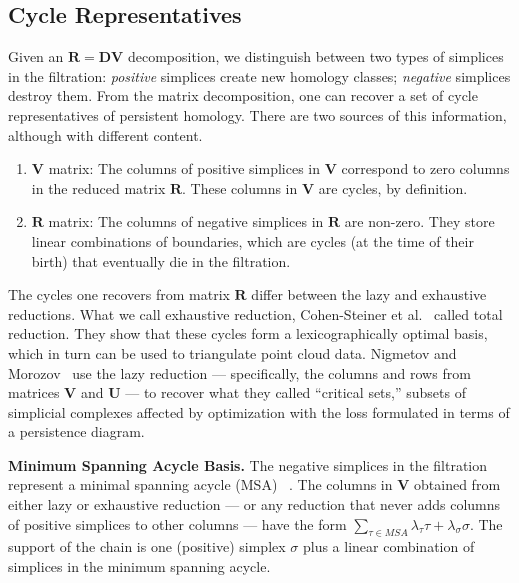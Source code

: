 \documentclass[10pt,a4paper]{article}
\newcommand{\mat}[1]{\mathbf{#1}}
\renewcommand{\paragraph}[1]{\noindent\textbf{#1.}}
\begin{document}
\subsection{Cycle Representatives}

Given an $\mat{R} = \mat{D} \mat{V}$ decomposition,
we distinguish between two types of simplices in the filtration: \emph{positive} simplices create new homology classes; \emph{negative} simplices destroy them.
From the matrix decomposition, one can recover a set of cycle representatives of persistent homology.
There are two sources of this information, although with different content.

\begin{enumerate}
    \item $\mat{V}$ matrix: The columns of positive simplices in $\mat{V}$ correspond to zero columns in the reduced matrix $\mat{R}$. These columns in $\mat{V}$ are cycles, by definition.
\item $\mat{R}$ matrix: The columns of negative simplices in $\mat{R}$ are non-zero. They store linear combinations of boundaries, which are cycles (at the time of their birth) that eventually die in the filtration.
\end{enumerate}

The cycles one recovers from matrix $\mat{R}$ differ between the lazy and exhaustive reductions. What we call exhaustive reduction, Cohen-Steiner et al.~\cite{CSLV22} called total reduction. They show that these cycles form a lexicographically optimal basis, which in turn can be used to triangulate point cloud data. Nigmetov and Morozov~\cite{NiMo24} use the lazy reduction --- specifically, the columns and rows from matrices $\mat{V}$ and $\mat{U}$ --- to recover what they called ``critical sets,'' subsets of simplicial complexes affected by optimization with the loss formulated in terms of a persistence diagram.

\vspace{0.1cm}
\paragraph{\textbf{Minimum Spanning Acycle Basis}}
The negative simplices in the filtration represent a minimal spanning acycle (MSA) ~\cite{kalai1983enumeration,skraba2020randomly}. The columns in $\mat{V}$ obtained from either lazy or exhaustive reduction --- or any  reduction that never adds columns of positive simplices to  other columns --- have the form $\sum_{\tau\in MSA} \lambda_\tau \tau + \lambda_\sigma \sigma$. The support of the chain is one (positive) simplex $\sigma$ plus a linear combination of simplices in the minimum spanning acycle.
\end{document}
